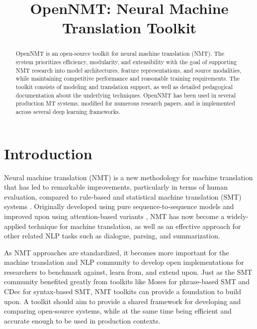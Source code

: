 \documentclass[]{article}
\begin{document}
\title{\bf OpenNMT: Neural Machine Translation Toolkit}

\author{ \hfill {}
\AND
         \hfill {}
\AND
        \hfill {}
        \AND
        \hfill {}
        \AND
        \hfill {}
        \AND
        \hfill {}
}

\maketitle
\pagestyle{empty}

\begin{abstract}
  OpenNMT is an open-source toolkit for neural machine translation
  (NMT).  The system prioritizes efficiency, modularity, and
  extensibility with the goal of supporting NMT research into model
  architectures, feature representations, and source modalities, while
  maintaining competitive performance and reasonable training
  requirements. The toolkit consists of modeling and translation
  support, as well as detailed pedagogical documentation about the
  underlying techniques. OpenNMT has been used in several production
  MT systems, modified for numerous research papers, and is
  implemented across several deep learning frameworks.
\end{abstract}

\section{Introduction}


Neural machine translation (NMT) is a new methodology for machine
translation that has led to remarkable improvements, particularly in
terms of human evaluation, compared to rule-based
and statistical machine translation (SMT) systems
\citep{wu2016google,systran}. Originally developed using pure
sequence-to-sequence models \citep{sutskever14sequence,Cho2014} and
improved upon using attention-based variants \citep{Bahdanau2015,Luong2015}, NMT has now become a widely-applied technique for machine
translation, as well as an effective approach for other related NLP
tasks such as dialogue, parsing, and summarization.

As NMT approaches are standardized, it becomes more important for the
machine translation and NLP community to develop open implementations
for researchers to benchmark against, learn from, and extend
upon. Just as the SMT community benefited greatly from toolkits like
Moses \citep{koehn2007moses} for phrase-based SMT and CDec
\citep{dyer2010cdec} for syntax-based SMT, NMT toolkits can provide a
foundation to build upon. A toolkit should aim to provide
a shared framework for developing and comparing open-source systems,
while at the same time being efficient and accurate enough to be used
in production contexts.
\end{document}
